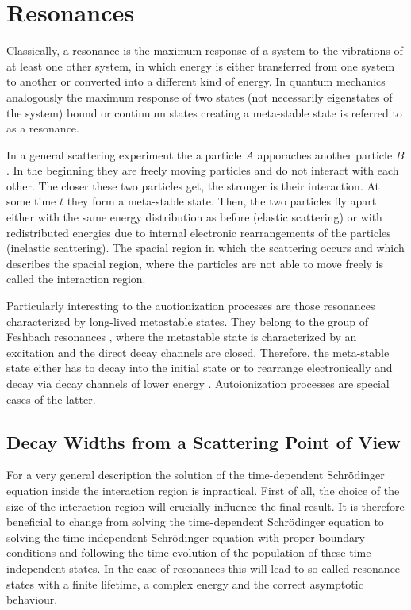 \chapter{Resonances}

Classically, a resonance is the maximum response of a system to the vibrations
of at least one other
system, in which energy is either transferred from 
one system to another or converted into a different kind of energy.
In quantum mechanics analogously the maximum response 
of two states (not necessarily eigenstates of the system) 
bound or continuum states creating a meta-stable state is referred to as a resonance.

In a general scattering experiment the a particle $A$ apporaches another
particle $B$. In the beginning they are freely moving particles and do not interact
with each other. The closer these two particles get, the stronger is their interaction.
At some time $t$ they form a meta-stable state. Then, the two particles fly apart
either with the same energy distribution as before (elastic scattering) or with
redistributed energies due to internal electronic rearrangements of the particles
(inelastic scattering). The spacial region in which the scattering occurs and
which describes the spacial region, where the particles are not able to move freely is
called the interaction region.

Particularly interesting to the auotionization processes are those resonances
characterized by long-lived metastable states. They belong to the group of Feshbach
resonances \cite{Feshbach58}, where the metastable state is characterized by an
excitation and the direct decay channels are closed. Therefore, the meta-stable
state either has to decay into the initial state or to rearrange electronically
and decay via decay channels of lower energy \cite{Kukulin_book}.
Autoionization processes are special
cases of the latter.





\section{Decay Widths from a Scattering Point of View}
For a very general description the solution of the time-dependent Schrödinger
equation inside the interaction region is inpractical. First of all, the
choice of the size of the interaction region will crucially influence the
final result. It is therefore beneficial to change from solving the time-dependent
Schrödinger equation to solving the time-independent Schrödinger equation
with proper boundary conditions and following the time evolution of the population
of these time-independent states. In the case of resonances
this will lead to so-called resonance states
with a finite lifetime, a complex energy and the correct asymptotic behaviour.

